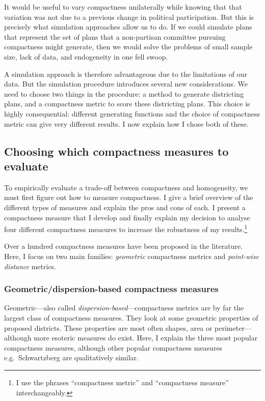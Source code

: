\documentclass[]{article}
\begin{document}
It would be useful to vary compactness unilaterally while knowing that
that variation was not due to a previous change in political
participation. But this is precisely what simulation approaches allow us
to do. If we could simulate plans that represent the set of plans that a
non-partisan committee pursuing compactness might generate, then we
would solve the problems of small sample size, lack of data, and
endogeneity in one fell swoop.

A simulation approach is therefore advantageous due to the limitations
of our data. But the simulation procedure introduces several new
considerations. We need to choose two things in the procedure: a method
to generate districting plans, and a compactness metric to score these
districting plans. This choice is highly consequential: different
generating functions and the choice of compactness metric can give very
different results. I now explain how I chose both of these.

\hypertarget{choosing-which-compactness-measures-to-evaluate}{%
\subsection{Choosing which compactness measures to
evaluate}\label{choosing-which-compactness-measures-to-evaluate}}

To empirically evaluate a trade-off between compactness and homogeneity,
we must first figure out how to measure compactness. I give a brief
overview of the different types of measures and explain the pros and
cons of each. I present a compactness measure that I develop and finally
explain my decision to analyse four different compactness measures to
increase the robustness of my results.\footnote{I use the phrases
  ``compactness metric'' and ``compactness measure'' interchangeably.}

Over a hundred compactness measures have been proposed in the
literature. Here, I focus on two main families: \emph{geometric}
compactness metrics and \emph{point-wise distance} metrics.

\hypertarget{geometricdispersion-based-compactness-measures}{%
\subsubsection{Geometric/dispersion-based compactness
measures}\label{geometricdispersion-based-compactness-measures}}

Geometric---also called \emph{dispersion-based}---compactness metrics
are by far the largest class of compactness measures. They look at some
geometric properties of proposed districts. These properties are most
often shapes, area or perimeter---although more esoteric measures do
exist. Here, I explain the three most popular compactness measures,
although other popular compactness measures e.g.~Schwartzberg are
qualitatively similar.
\end{document}

